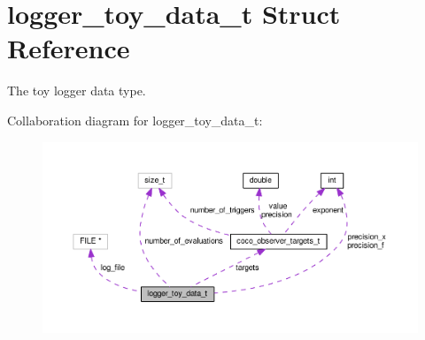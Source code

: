 \hypertarget{structlogger__toy__data__t}{}\section{logger\+\_\+toy\+\_\+data\+\_\+t Struct Reference}
\label{structlogger__toy__data__t}


The toy logger data type.  




Collaboration diagram for logger\+\_\+toy\+\_\+data\+\_\+t\+:\nopagebreak
\begin{figure}[H]
\begin{center}
\leavevmode
\includegraphics[width=350pt]{structlogger__toy__data__t__coll__graph}
\end{center}
\end{figure}

